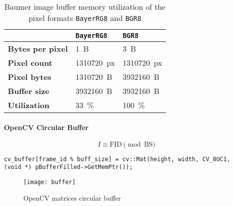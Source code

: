 \begin{table}[h]
  \caption{Baumer image buffer memory utilization of the pixel formats \texttt{BayerRG8} and \texttt{BGR8}}
  \label{tab:buffer_memory_utilization}
  \centering
  \begin{tabular}{lll}
    \toprule
     & \textbf{\texttt{BayerRG8}} & \textbf{\texttt{BGR8}} \\
    \midrule
    \textbf{Bytes per pixel} & \SI{1}{B} & \SI{3}{B} \\
    \textbf{Pixel count} & \SI{1310720}{px} & \SI{1310720}{px} \\
    \textbf{Pixel bytes} & \SI{1310720}{B} & \SI{3932160}{B} \\
    \textbf{Buffer size} & \SI{3932160}{B} & \SI{3932160}{B} \\
    \textbf{Utilization} & \SI{33}{\percent} & \SI{100}{\percent} \\
    \bottomrule
  \end{tabular}
\end{table}

\paragraph{OpenCV Circular Buffer}





\begin{equation}
  I \equiv \text{FID} \pmod{\text{BS}}
  \label{eq:indexing}
\end{equation}

\begin{lstlisting}[style=C++]
  cv_buffer[frame_id % buff_size] = cv::Mat(height, width, CV_8UC1, (void *) pBufferFilled->GetMemPtr());
\end{lstlisting}

\begin{figure}[h]
  \centering
  \texttt{[image: buffer]}
  \caption{OpenCV matrices circular buffer}
  \label{fig:circular_buffer}
\end{figure}


